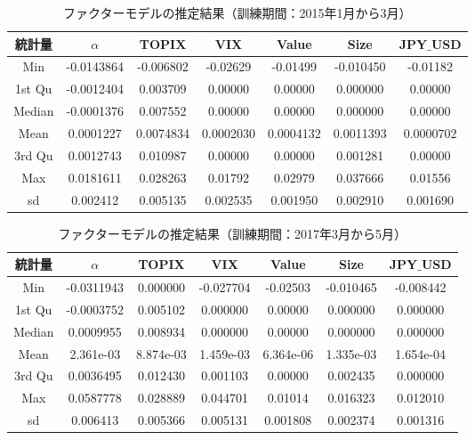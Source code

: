 ﻿\documentclass[a4paper]{jarticle}
\begin{document}
\begin{table}[H]
\caption{ファクターモデルの推定結果（訓練期間：2015年1月から3月）}
\begin{center}
\begin{tabular}{|c|c|c|c|c|c|c|}
\hline
 統計量& $\alpha$    &         TOPIX   &             VIX      &        Value   &         Size       &        JPY$\_$USD    \\      
\hline
\hline
 Min&-0.0143864& -0.006802& -0.02629 & -0.01499 &-0.010450 &-0.01182 \\
 1st Qu&-0.0012404 & 0.003709 & 0.00000 &  0.00000 & 0.000000 & 0.00000 \\ 
 Median &-0.0001376 & 0.007552 & 0.00000  & 0.00000 & 0.000000 & 0.00000 \\ 
 Mean   &0.0001227& 0.0074834& 0.0002030& 0.0004132& 0.0011393& 0.0000702  \\
 3rd Qu& 0.0012743 & 0.010987 & 0.00000  & 0.00000 & 0.001281 & 0.00000  \\
 Max  &0.0181611 & 0.028263 & 0.01792  & 0.02979 & 0.037666 & 0.01556 \\
\hline
sd & 0.002412  & 0.005135  & 0.002535 &0.001950 &0.002910 & 0.001690 \\
\hline
\end{tabular}
\end{center}
\label{tbl:model_summary1}
\end{table}


\begin{table}[H]
\caption{ファクターモデルの推定結果（訓練期間：2017年3月から5月）}
\begin{center}
\begin{tabular}{|c|c|c|c|c|c|c|}
\hline
 統計量& $\alpha$   &         TOPIX   &             VIX      &        Value   &         Size       &        JPY$\_$USD    \\      
\hline
\hline
 Min&-0.0311943 &0.000000&-0.027704 & -0.02503& -0.010465& -0.008442 \\
 1st Qu&-0.0003752 & 0.005102 & 0.000000  & 0.00000 & 0.000000 & 0.000000 \\ 
 Median &0.0009955 &0.008934 & 0.000000  & 0.00000 & 0.000000 & 0.000000 \\ 
 Mean   &2.361e-03 & 8.874e-03 & 1.459e-03 & 6.364e-06 & 1.335e-03 & 1.654e-04   \\
 3rd Qu&0.0036495 & 0.012430 & 0.001103  & 0.00000 & 0.002435 & 0.000000  \\
 Max   &0.0587778 & 0.028889 & 0.044701  & 0.01014 & 0.016323 & 0.012010 \\
\hline
sd &  0.006413 & 0.005366 & 0.005131 & 0.001808 & 0.002374&  0.001316 \\
\hline
\end{tabular}
\end{center}
\label{tbl:model_summary2}
\end{table}
\end{document}
